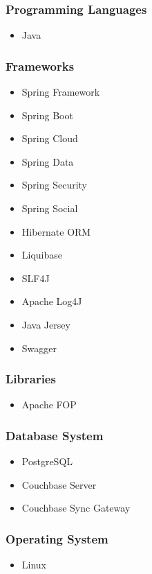 \documentclass[a4paper,10pt]{article}
\begin{document}
\subsubsection{Programming Languages}
	\begin{itemize}
		\item Java
\end{itemize}
\subsubsection{Frameworks}
	\begin{itemize}
		\item Spring Framework
		\item Spring Boot
		\item Spring Cloud
		\item Spring Data
		\item Spring Security
		\item Spring Social
		\item Hibernate ORM
		\item Liquibase
		\item SLF4J
		\item Apache Log4J
		\item Java Jersey		
		\item Swagger
	\end{itemize}

\subsubsection{Libraries}
	\begin{itemize}
		\item Apache FOP

	\end{itemize}

\subsubsection{Database System}
	\begin{itemize}
		\item PostgreSQL
		\item Couchbase Server
		\item Couchbase Sync Gateway
	\end{itemize}

\subsubsection{Operating System}
	\begin{itemize}
		\item Linux
	\end{itemize}
\end{document}
